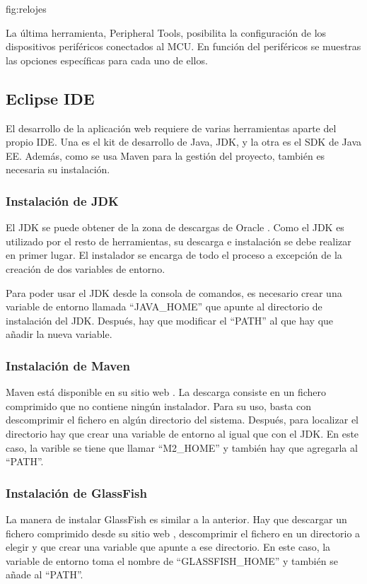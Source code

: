 {fig:relojes}{}

La última herramienta, Peripheral Tools, posibilita la configuración de los
dispositivos periféricos conectados al MCU. En función del periféricos se
muestras las opciones específicas para cada uno de ellos.



\subsection{Eclipse IDE} \label{sec:man-dev-eclipse}
El desarrollo de la aplicación web requiere de varias herramientas aparte
del propio IDE. Una es el kit de desarrollo de Java, JDK, y la otra es el
SDK de Java EE. Además, como se usa Maven para la gestión del proyecto, también
es necesaria su instalación.

\subsubsection{Instalación de JDK} \label{sec:jdk}
El JDK se puede obtener de la zona de descargas de Oracle \cite{webpage:javaee}.
Como el JDK es utilizado por el resto de herramientas, su descarga e instalación
se debe realizar en primer lugar. El instalador se encarga de todo el proceso a
excepción de la creación de dos variables de entorno.

Para poder usar el JDK desde la consola de comandos, es necesario crear
una variable de entorno llamada ``JAVA\_HOME'' que apunte al directorio de
instalación del JDK. Después, hay que modificar el ``PATH'' al que hay
que añadir la nueva variable.

\subsubsection{Instalación de Maven} \label{sec:maven}
Maven está disponible en su sitio web \cite{webpage:maven}. La descarga consiste
en un fichero comprimido que no contiene ningún instalador. Para su uso, basta
con descomprimir el fichero en algún directorio del sistema. Después, para
localizar el directorio hay que crear una variable de entorno al igual que con
el JDK. En este caso, la varible se tiene que llamar ``M2\_HOME'' y también
hay que agregarla al ``PATH''.

\subsubsection{Instalación de GlassFish} \label{sec:glassfish}
La manera de instalar GlassFish es similar a la anterior. Hay que descargar un
fichero comprimido desde su sitio web \cite{webpage:glassfish}, descomprimir
el fichero en un directorio a elegir y que crear una variable que apunte a ese
directorio. En este caso, la variable de entorno toma el nombre de 
``GLASSFISH\_HOME'' y también se añade al ``PATH''.

